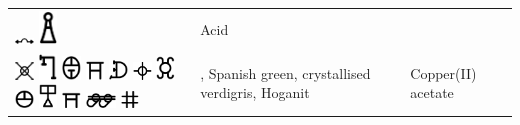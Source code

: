\documentclass[british,final,landscape]{scrartcl}
\begin{document}
\begin{refsection}
 \tablelasttail{\bottomrule} \label{tab:Compounds}
 \begin{supertabular}{p{0.3\textwidth}p{0.34\textwidth}p{0.34\textwidth}}
   \includegraphics[width=5mm]{Compounds/Acid} \includegraphics[width=5mm]{Compounds/Acid2} & Acid  & \\
   \includegraphics[width=5mm]{Compounds/AesViride} \includegraphics[width=5mm]{Compounds/AesViride2} \includegraphics[width=5mm]{Compounds/AesViride3} \includegraphics[width=5mm]{Compounds/AesViride4} \includegraphics[width=5mm]{Compounds/AesViride5} \includegraphics[width=5mm]{Compounds/AesViride6} \includegraphics[width=5mm]{Compounds/AesViride7} \includegraphics[width=5mm]{Compounds/AesViride8} \includegraphics[width=5mm]{Compounds/AesViride9} \includegraphics[width=5mm]{Compounds/AesViride10} \includegraphics[width=8mm]{Compounds/AesViride11} \includegraphics[width=5mm]{Compounds/AesViride12} & , Spanish green, crystallised verdigris, Hoganit   & Copper(II) acetate \\

\end{supertabular}
\end{refsection}
\end{document}
